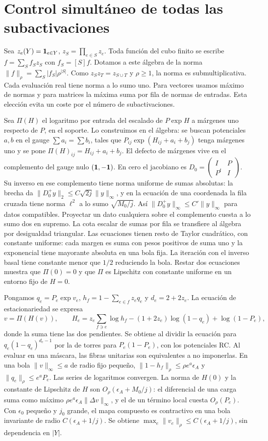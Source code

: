\section{Control simultáneo de todas las subactivaciones}
Sea $z_e(Y)={\bf1}_{e\in Y}$, $z_S=\prod_{e\in S}z_e$. Toda función del cubo finito
se escribe $f=\sum_S f_S z_S$ con $f_S=[S]f$. Dotamos a este álgebra de la norma
$\|f\|_\rho=\sum_S |f_S|\rho^{|S|}$. Como $z_S z_T=z_{S\cup T}$ y $\rho\ge1$,
la norma es submultiplicativa. Cada evaluación real tiene norma a lo sumo uno.
Para vectores usamos máximo de normas y para matrices la máxima suma por fila de
normas de entradas. Esta elección evita un coste por el número de subactivaciones.

Sea $\Pi(H)$ el logaritmo por entrada del escalado de $P\exp H$ a márgenes uno
respecto de $P$, en el soporte. Lo construimos en el álgebra: se buscan potenciales
$a,b$ en el gauge $\sum a_i=\sum b_i$, tales que $P_{ij}\exp(H_{ij}+a_i+b_j)$
tenga márgenes uno y se pone $\Pi(H)_{ij}=H_{ij}+a_i+b_j$. El defecto de márgenes
vive en el complemento del gauge nulo $({\bf1},-{\bf1})$. En cero el jacobiano es
$D_0=\left(\begin{smallmatrix}I&P\\P^t&I\end{smallmatrix}\right)$.
Su inverso en ese complemento tiene norma uniforme de sumas absolutas: la brecha da
$\|D_0^+ y\|_2\le C\sqrt{2j}\|y\|_\infty$, y en la ecuación de una coordenada la
fila cruzada tiene norma $\ell^2$ a lo sumo $\sqrt{M_0/j}$. Así
$\|D_0^+y\|_\infty\le C'\|y\|_\infty$ para datos compatibles.
Proyectar un dato cualquiera sobre el complemento cuesta a lo sumo dos en supremo.
La cota escalar de sumas por fila se transfiere al álgebra por desigualdad triangular.
Las ecuaciones tienen resto de Taylor cuadrático, con constante uniforme: cada
margen es suma con pesos positivos de suma uno y la exponencial tiene mayorante
absoluta en una bola fija. La iteración con el inverso basal tiene constante menor
que $1/2$ reduciendo la bola. Restar dos ecuaciones muestra que $\Pi(0)=0$ y que
$\Pi$ es Lipschitz con constante uniforme en un entorno fijo de $H=0$.

Pongamos $q_e=P_e\exp v_e$, $h_f=1-\sum_{e\in f}z_e q_e$ y $d_e=2+2z_e$.
La ecuación de estacionariedad se expresa
\[
 v=\Pi(H(v)),\qquad
 H_e=z_e\sum_{f\ni e}\log h_f-(1+2z_e)\log(1-q_e)+\log(1-P_e),
\]
donde la suma tiene las dos pendientes. Se obtiene al dividir la ecuación para
$q_e(1-q_e)^{d_e-1}$ por la de torres para $P_e(1-P_e)$, con los potenciales RC.
Al evaluar en una máscara, las fibras unitarias son equivalentes a no imponerlas.
En una bola $\|v\|_\infty\le a$ de radio fijo pequeño,
$\|1-h_f\|_\rho\le\rho e^a\epsilon_A$ y $\|q_e\|_\rho\le e^a P_e$.
Las series de logaritmos convergen. La norma de $H(0)$ y la constante de Lipschitz
de $H$ son $O_\rho(\epsilon_A+M_0/j)$: el diferencial de una carga suma como máximo
$\rho e^a\epsilon_A\|\Delta v\|_\infty$, y el de un término local cuesta $O_\rho(P_e)$.
Con $\epsilon_0$ pequeño y $j_0$ grande, el mapa compuesto es contractivo en una
bola invariante de radio $C(\epsilon_A+1/j)$. Se obtiene
$\max_e\|v_e\|_\rho\le C(\epsilon_A+1/j)$, sin dependencia en $|Y|$.

